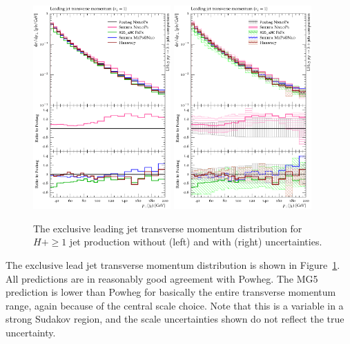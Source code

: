 \begin{figure}[t!]
  \centering
  \includegraphics[width=0.47\textwidth]{figures/hjetscomp_u_jet1_pT_excl.pdf}
  \hfill
  \includegraphics[width=0.47\textwidth]{figures/hjetscomp_jet1_pT_excl.pdf}
  \caption{
    The exclusive leading jet transverse momentum distribution for
    $H+\ge1$ jet production without (left) and with (right) uncertainties.
    \label{fig:higgscomp:results:1obs:j1pt_excl}
  }
\end{figure}

The exclusive lead jet transverse momentum distribution is shown in
Figure~\ref{fig:higgscomp:results:1obs:j1pt_excl}. All predictions are
in reasonably good agreement with Powheg. The MG5 prediction is lower
than Powheg for basically the entire transverse momentum range, again
because of the central scale choice. Note that this is a variable in a
strong Sudakov region, and the scale uncertainties shown do not
reflect the true uncertainty.

